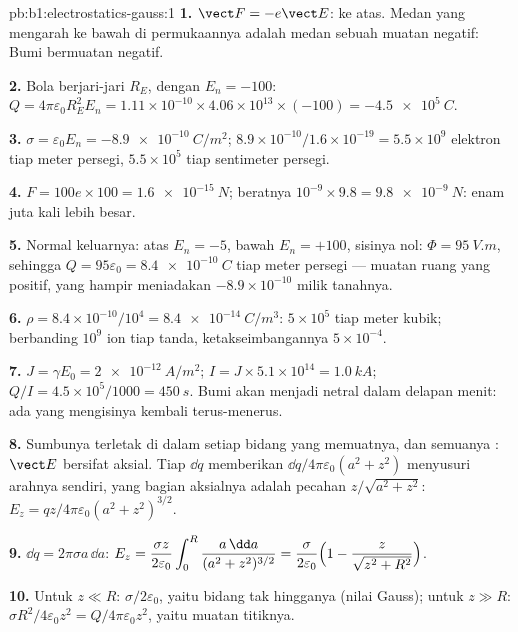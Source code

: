 \begin{solution}{pb:b1:electrostatics-gauss:1}
\textbf{1.} $\vect F = -e\vect E$: ke atas. Medan yang mengarah ke bawah di permukaannya
adalah medan sebuah muatan negatif: Bumi bermuatan negatif.

\textbf{2.} Bola berjari-jari $R_E$, dengan $E_n = -100$: $Q = 4\pi\varepsilon_0R_E^2E_n =
1.11 \times 10^{-10} \times 4.06 \times 10^{13} \times (-100) = \qty{-4.5e5}{C}$.

\textbf{3.} $\sigma = \varepsilon_0E_n = \qty{-8.9e-10}{C/m^2}$; $8.9 \times 10^{-10}/1.6 \times
10^{-19} = 5.5 \times 10^9$ elektron tiap meter persegi, $5.5 \times 10^5$ tiap
sentimeter persegi.

\textbf{4.} $F = 100e \times 100 = \qty{1.6e-15}{N}$; beratnya $10^{-9} \times 9.8 =
\qty{9.8e-9}{N}$: enam juta kali lebih besar.

\textbf{5.} Normal keluarnya: atas $E_n = -5$, bawah $E_n = +100$, sisinya
nol: $\Phi = \qty{95}{V.m}$, sehingga $Q = 95\varepsilon_0 = \qty{+8.4e-10}{C}$ tiap meter
persegi --- muatan ruang yang positif, yang hampir meniadakan
$-8.9 \times 10^{-10}$ milik tanahnya.

\textbf{6.} $\rho = 8.4 \times 10^{-10}/10^4 = \qty{8.4e-14}{C/m^3}$: $5 \times 10^5$
 tiap meter kubik; berbanding $10^9$ ion tiap tanda,
ketakseimbangannya $5 \times 10^{-4}$.

\textbf{7.} $J = \gamma E_0 = \qty{2e-12}{A/m^2}$; $I = J \times 5.1 \times 10^{14} =
\qty{1.0}{kA}$; $Q/I = 4.5 \times 10^5/1000 = \qty{450}{s}$. Bumi akan menjadi
netral dalam delapan menit: ada yang mengisinya kembali terus-menerus.

\textbf{8.} Sumbunya terletak di dalam setiap bidang yang memuatnya, dan semuanya : $\vect E$ bersifat aksial. Tiap $\dd q$ memberikan $\dd q/4\pi\varepsilon_0(a^2 + z^2)$
menyusuri arahnya sendiri, yang bagian aksialnya adalah pecahan
$z/\sqrt{a^2 + z^2}$: $E_z = qz/4\pi\varepsilon_0(a^2 + z^2)^{3/2}$.

\textbf{9.} $\dd q = 2\pi\sigma a\,\dd a$: $E_z = \dfrac{\sigma z}{2\varepsilon_0}\displaystyle\int_0^R
\dfrac{a\,\dd a}{(a^2 + z^2)^{3/2}} = \dfrac{\sigma}{2\varepsilon_0}\Bigl(1 - \dfrac{z}{\sqrt{z^2
+ R^2}}\Bigr)$.

\textbf{10.} Untuk $z \ll R$: $\sigma/2\varepsilon_0$, yaitu bidang tak hingganya (nilai Gauss);
untuk $z \gg R$: $\sigma R^2/4\varepsilon_0z^2 = Q/4\pi\varepsilon_0z^2$, yaitu muatan titiknya.


\end{solution}
